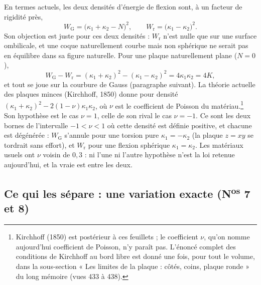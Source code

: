 \documentclass[11pt,a4paper]{article}
\begin{document}
En termes actuels, les deux densités d'énergie de flexion sont, à un facteur
de rigidité près,
\[
W_{\mathrm{G}} = \bigl(\kappa_1 + \kappa_2 - N\bigr)^2 ,
\qquad
W_{\mathrm{r}} = \bigl(\kappa_1 - \kappa_2\bigr)^2 .
\]
Son objection est juste pour ces deux densités : $W_{\mathrm{r}}$ n'est nulle
que sur une surface ombilicale, et une coque naturellement courbe mais non
sphérique ne serait pas en équilibre dans sa figure naturelle. Pour une plaque
naturellement plane ($N = 0$),
\[
W_{\mathrm{G}} - W_{\mathrm{r}} = (\kappa_1+\kappa_2)^2 - (\kappa_1-\kappa_2)^2
= 4\kappa_1\kappa_2 = 4K ,
\]
et tout se joue sur la courbure de Gauss (paragraphe suivant). La théorie
actuelle des plaques minces (Kirchhoff, 1850) donne pour densité
$(\kappa_1+\kappa_2)^2 - 2(1-\nu)\kappa_1\kappa_2$, où $\nu$ est le coefficient
de Poisson du matériau.\footnote{Kirchhoff (1850) est postérieur à ces feuillets ; le
coefficient $\nu$, qu'on nomme aujourd'hui coefficient de Poisson, n'y paraît
pas. L'énoncé complet des conditions de Kirchhoff au bord libre est donné une fois, pour tout le volume, dans la sous-section « Les limites de la plaque : côtés, coins, plaque ronde » du long mémoire (vues 433 à 438).} Son hypothèse est
le cas $\nu = 1$, celle de son rival le cas $\nu = -1$. Ce sont les deux bornes
de l'intervalle $-1 < \nu < 1$ où cette densité est définie positive, et
chacune est dégénérée : $W_{\mathrm{G}}$ s'annule pour une torsion pure
$\kappa_1 = -\kappa_2$ (la plaque $z = xy$ se tordrait sans effort), et
$W_{\mathrm{r}}$ pour une flexion sphérique $\kappa_1 = \kappa_2$. Les
matériaux usuels ont $\nu$ voisin de $0{,}3$ : ni l'une ni l'autre hypothèse
n'est la loi retenue aujourd'hui, et la vraie est entre les deux.

\subsection*{Ce qui les sépare : une variation exacte (N\textsuperscript{os} 7 et 8)}
\end{document}
